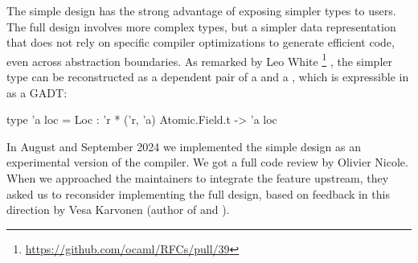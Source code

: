 The simple design has the strong advantage of exposing simpler types to users.
The full design involves more complex types, but a simpler data representation that does not rely on specific compiler optimizations to generate efficient code, even across abstraction boundaries.
As remarked by Leo White%
\footnote{
\url{https://github.com/ocaml/RFCs/pull/39}
}%
, the simpler type  can be reconstructed as a dependent pair of a  and a , which is expressible in \OCaml as a GADT:
\begin{ocamlcode}
type 'a loc = Loc : 'r * ('r, 'a) Atomic.Field.t -> 'a loc
\end{ocamlcode}

In August and September 2024 we implemented the simple design as an experimental version of the \OCaml compiler.
We got a full code review by Olivier Nicole.
When we approached the \OCaml maintainers to integrate the feature upstream, they asked us to reconsider implementing the full design, based on feedback in this direction by Vesa Karvonen (author of \Kcas and \Saturn).

